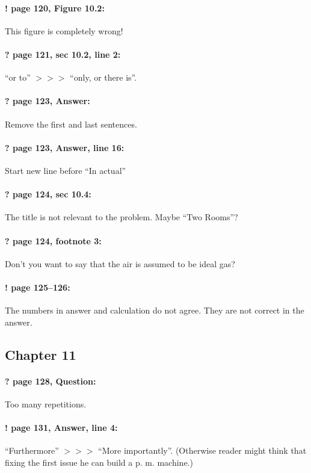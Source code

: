 \documentclass[twoside]{article}
\begin{document}
\paragraph{! page 120, Figure 10.2:} This figure is completely wrong!

\paragraph{? page 121, sec 10.2, line 2:} ``or to'' $>\!>\!>$ ``only, or there is''.

\paragraph{? page 123, Answer:} Remove the first and last sentences.

\paragraph{? page 123, Answer, line 16:} Start new line before ``In actual''

\paragraph{? page 124, sec 10.4:} The title is not relevant to the problem. Maybe ``Two Rooms''?

\paragraph{? page 124, footnote 3:} Don't you want to say that the air is assumed to be ideal gas?

\paragraph{! page 125--126:} The numbers in answer and calculation do not agree.
They are not correct in the answer.

\subsection*{Chapter 11}

\paragraph{? page 128, Question:} Too many repetitions.

\paragraph{! page 131, Answer, line 4:} ``Furthermore'' $>\!>\!>$ ``More importantly''. (Otherwise reader might think that fixing the first issue he can build a p. m. machine.)
\end{document}
